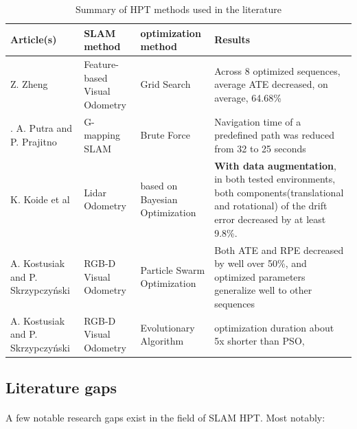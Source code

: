 \begin{landscape}
\begin{table}[h]
\centering
\begin{tabular}{|p{30mm}| p{30mm}| p{50mm}| p{75mm}|}
\hline
Article(s)                        & SLAM method                   & optimization method            & Results \\ \hline
Z. Zheng\cite{zheng2020feature}                          & Feature-based Visual Odometry & Grid Search                    &  Across 8 optimized sequences, average ATE decreased, on average, 64.68\%       \\ \hline
. A. Putra and P. Prajitno\cite{putra2019parameter}     & G-mapping SLAM                & Brute Force                    &  Navigation time of a predefined path was reduced from 32 to 25 seconds      \\ \hline
K. Koide et al\cite{koide2021automatic}                    & Lidar Odometry                & based on Bayesian Optimization & \textbf{With data augmentation}, in both tested environments, both components(translational and rotational) of the drift error decreased by at least 9.8\%.      \\ \hline
A. Kostusiak and P. Skrzypczyński\cite{kostusiak2019efficiency} & RGB-D Visual Odometry         & Particle Swarm Optimization    & Both ATE and RPE decreased by well over 50\%, and optimized parameters generalize well to other sequences        \\ \hline
A. Kostusiak and P. Skrzypczyński\cite{kostusiak2019efficiency} & RGB-D Visual Odometry         & Evolutionary Algorithm         &  optimization duration about 5x shorter than \ac{PSO},        \\ \hline
\end{tabular}
\caption{Summary of HPT methods used in the literature}
\label{tab:my-table}
\end{table}
\end{landscape}

\newpage

\subsection{Literature gaps}
\paragraph{}A few notable research gaps exist in the field of SLAM \ac{HPT}. Most notably:


